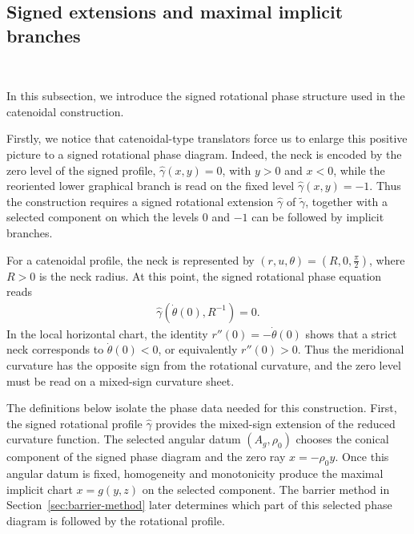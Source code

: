 \documentclass{amsart}
\theoremstyle{plain}
\theoremstyle{mainintrothm}
\theoremstyle{definition}
\begin{document}
	\subsection{Signed extensions and maximal implicit branches}\,
	\label{subsec:signed-level-sheets}

	In this subsection, we introduce the signed rotational phase structure used in
	the catenoidal construction.  
	
	\medskip
	
	Firstly, we notice that catenoidal-type translators force us to enlarge this positive picture to a signed rotational phase diagram.  Indeed, the neck is encoded by the zero level of the signed profile, $\widehat\gamma(x,y)=0$, with $y>0$ and $x<0$, while the reoriented lower graphical branch is read on the fixed level $\widehat\gamma(x,y)=-1$. Thus the construction requires a signed rotational extension $\widehat\gamma$ of $\widetilde\gamma$, together with a selected component on
	which the levels $0$ and $-1$ can be followed by implicit branches.

	\medskip

	For a catenoidal profile, the neck is represented by $(r,u,\theta)= \left(R,0,\frac{\pi}{2}\right)$, where $R>0$ is the neck radius.  At this point, the signed rotational phase
	equation reads
	\begin{align}
		\label{sec3:neck-zero-level}
		\widehat\gamma\left(\dot\theta(0),R^{-1}\right)=0.
	\end{align}
	In the local horizontal chart, the identity $r''(0)=-\dot\theta(0)$ shows that a
	strict neck corresponds to $\dot\theta(0)<0$, or equivalently $r''(0)>0$.
	Thus the meridional curvature has the opposite sign from the rotational
	curvature, and the zero level must be read on a mixed-sign curvature sheet.

	\medskip

	The definitions below isolate the phase data needed for this construction.
	First, the signed rotational profile $\widehat\gamma$ provides the mixed-sign
	extension of the reduced curvature function.  The selected angular datum
	$(A_g,\rho_0)$ chooses the conical component of the signed phase diagram and
	the zero ray $x=-\rho_0y$.  Once this angular datum is fixed, homogeneity and
	monotonicity produce the maximal implicit chart $x=g(y,z)$ on the selected
	component.  The barrier method in Section~\ref{sec:barrier-method} later
	determines which part of this selected phase diagram is followed by the
	rotational profile.
\end{document}
